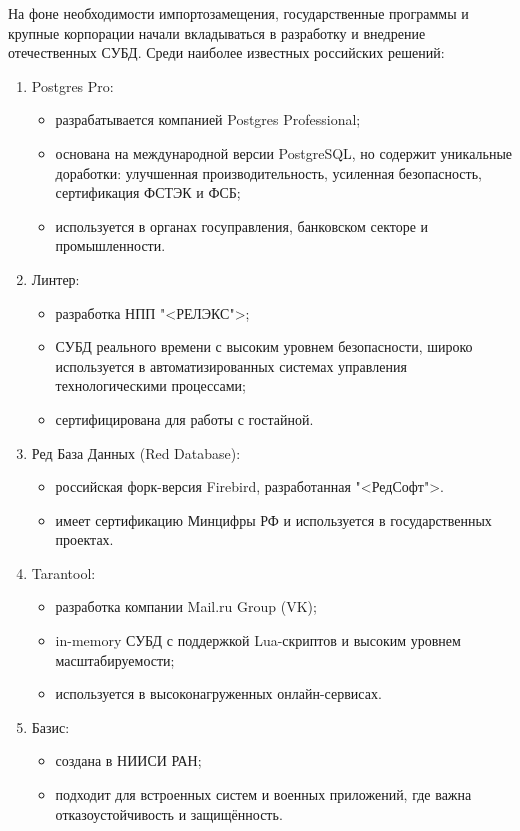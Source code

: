 На фоне необходимости импортозамещения, государственные программы и крупные корпорации начали вкладываться в разработку и внедрение отечественных СУБД. Среди наиболее известных российских решений:
\begin{enumerate}
	\item Postgres Pro:
	\begin{itemize}
		\item разрабатывается компанией Postgres Professional;
		\item основана на международной версии PostgreSQL, но содержит уникальные доработки: улучшенная производительность, усиленная безопасность, сертификация ФСТЭК и ФСБ;
		\item используется в органах госуправления, банковском секторе и промышленности.
	\end{itemize}
	\item Линтер:
	\begin{itemize}
		\item разработка НПП "<РЕЛЭКС">;
		\item СУБД реального времени с высоким уровнем безопасности, широко используется в автоматизированных системах управления технологическими процессами;
		\item сертифицирована для работы с гостайной.
	\end{itemize}
	\item Ред База Данных (Red Database):
	\begin{itemize}
		\item российская форк-версия Firebird, разработанная "<РедСофт">.
		\item имеет сертификацию Минцифры РФ и используется в государственных проектах.
	\end{itemize}
	\item Tarantool:
	\begin{itemize}
		\item разработка компании Mail.ru Group (VK);
		\item in-memory СУБД с поддержкой Lua-скриптов и высоким уровнем масштабируемости;
		\item используется в высоконагруженных онлайн-сервисах.
	\end{itemize}
	\item Базис:
	\begin{itemize}
		\item создана в НИИСИ РАН;
		\item подходит для встроенных систем и военных приложений, где важна отказоустойчивость и защищённость.
	\end{itemize}
\end{enumerate}

